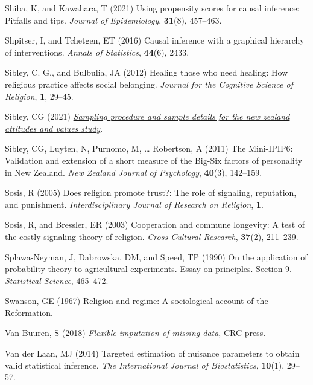\documentclass[
  single column]{article}
\newlength{\cslhangindent}
\newenvironment{CSLReferences}[2] %
 {\begin{list}{}{%
  \setlength{\itemindent}{0pt}
  \setlength{\leftmargin}{0pt}
  \setlength{\parsep}{0pt}
  \ifodd #1
   \setlength{\leftmargin}{\cslhangindent}
   \setlength{\itemindent}{-1\cslhangindent}
  \fi
  \setlength{\itemsep}{#2\baselineskip}}}
 {\end{list}}
\begin{document}
\begin{CSLReferences}{1}{0}
Shiba, K, and Kawahara, T (2021) Using propensity scores for causal
inference: Pitfalls and tips. \emph{Journal of Epidemiology},
\textbf{31}(8), 457--463.

Shpitser, I, and Tchetgen, ET (2016) Causal inference with a graphical
hierarchy of interventions. \emph{Annals of Statistics}, \textbf{44}(6),
2433.

Sibley, C. G., and Bulbulia, JA (2012) Healing those who need healing:
How religious practice affects social belonging. \emph{Journal for the
Cognitive Science of Religion}, \textbf{1}, 29--45.

Sibley, CG (2021)
\emph{\href{https://doi.org/10.31234/osf.io/wgqvy}{Sampling procedure
and sample details for the new zealand attitudes and values study}}.

Sibley, CG, Luyten, N, Purnomo, M, \ldots{} Robertson, A (2011) The
Mini-IPIP6: Validation and extension of a short measure of the Big-Six
factors of personality in New Zealand. \emph{New Zealand Journal of
Psychology}, \textbf{40}(3), 142--159.

Sosis, R (2005) Does religion promote trust?: The role of signaling,
reputation, and punishment. \emph{Interdisciplinary Journal of Research
on Religion}, \textbf{1}.

Sosis, R, and Bressler, ER (2003) Cooperation and commune longevity: A
test of the costly signaling theory of religion. \emph{Cross-Cultural
Research}, \textbf{37}(2), 211--239.

Splawa-Neyman, J, Dabrowska, DM, and Speed, TP (1990) On the application
of probability theory to agricultural experiments. Essay on principles.
Section 9. \emph{Statistical Science}, 465--472.

Swanson, GE (1967) Religion and regime: A sociological account of the
{R}eformation.

Van Buuren, S (2018) \emph{Flexible imputation of missing data}, CRC
press.

Van der Laan, MJ (2014) Targeted estimation of nuisance parameters to
obtain valid statistical inference. \emph{The International Journal of
Biostatistics}, \textbf{10}(1), 29--57.


\end{CSLReferences}
\end{document}
